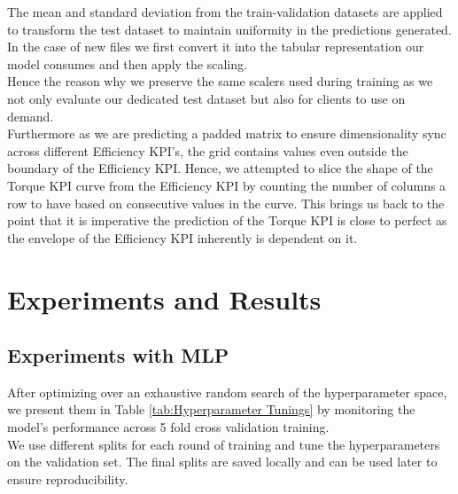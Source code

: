 \documentclass{report} %
\begin{document}
The mean and standard deviation from the train-validation datasets are applied to transform the test dataset to maintain uniformity in the predictions generated.
In the case of new files we first convert it into the tabular representation our model consumes and then apply the scaling.\\
Hence the reason why we preserve the same scalers used during training as we not only evaluate our dedicated test dataset but also for clients to use on demand. \\

Furthermore as we are predicting a padded matrix to ensure dimensionality sync across different Efficiency \ac{KPI}'s, the grid contains values even outside the boundary of the Efficiency \ac{KPI}.
Hence, we attempted to slice the shape of the Torque \ac{KPI} curve from the Efficiency \ac{KPI} by counting the number of columns a row to have based on consecutive values in the curve.
This brings us back to the point that it is imperative the prediction of the Torque \ac{KPI} is close to perfect as the envelope of the Efficiency \ac{KPI} inherently is dependent on it.

\newpage 
\newpage 

\chapter{Experiments and Results}

\section{Experiments with \ac{MLP}}\label{sec:Experiments with MLP}

After optimizing over an exhaustive random search of the hyperparameter space, we present them in Table \ref{tab:Hyperparameter Tunings} by monitoring the model's performance across 5 fold cross validation training.\\
We use different splits for each round of training and tune the hyperparameters on the validation set. The final splits are saved locally and can be used later to ensure reproducibility. 
\end{document}
